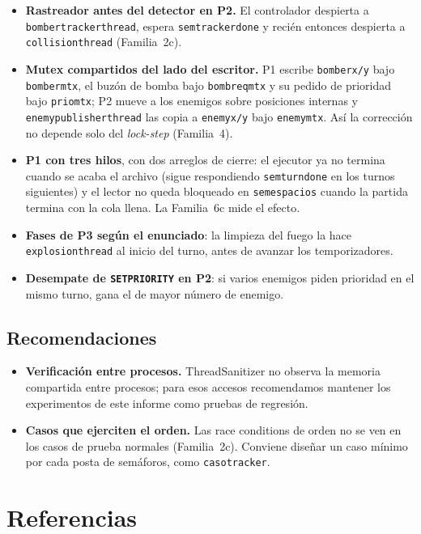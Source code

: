 \documentclass[11pt,a4paper]{article}
\newcommand{\cod}[1]{\texttt{#1}}
\renewcommand{\_}{\textunderscore\allowbreak}
\begin{document}
\begin{itemize}
  \item \textbf{Rastreador antes del detector en P2.} El controlador despierta a \cod{bomber\_tracker\_thread}, espera \cod{sem\_tracker\_done} y recién entonces despierta a \cod{collision\_thread} (Familia~2c).
  \item \textbf{Mutex compartidos del lado del escritor.} P1 escribe \cod{bomber\_x/y} bajo \cod{bomber\_mtx}, el buzón de bomba bajo \cod{bomb\_req\_mtx} y su pedido de prioridad bajo \cod{prio\_mtx}; P2 mueve a los enemigos sobre posiciones internas y \cod{enemy\_publisher\_thread} las copia a \cod{enemy\_x/y} bajo \cod{enemy\_mtx}. Así la corrección no depende solo del \emph{lock-step} (Familia~4).
  \item \textbf{P1 con tres hilos}, con dos arreglos de cierre: el ejecutor ya no termina cuando se acaba el archivo (sigue respondiendo \cod{sem\_turn\_done} en los turnos siguientes) y el lector no queda bloqueado en \cod{sem\_espacios} cuando la partida termina con la cola llena. La Familia~6c mide el efecto.
  \item \textbf{Fases de P3 según el enunciado}: la limpieza del fuego la hace \cod{explosion\_thread} al inicio del turno, antes de avanzar los temporizadores.
  \item \textbf{Desempate de \cod{SET\_PRIORITY} en P2}: si varios enemigos piden prioridad en el mismo turno, gana el de mayor número de enemigo.
\end{itemize}

\subsection{Recomendaciones}

\begin{itemize}
  \item \textbf{Verificación entre procesos.} ThreadSanitizer no observa la memoria compartida entre procesos; para esos accesos recomendamos mantener los experimentos de este informe como pruebas de regresión.
  \item \textbf{Casos que ejerciten el orden.} Las race conditions de orden no se ven en los casos de prueba normales (Familia~2c). Conviene diseñar un caso mínimo por cada posta de semáforos, como \cod{caso\_tracker}.
\end{itemize}

\section{Referencias}
\end{document}
